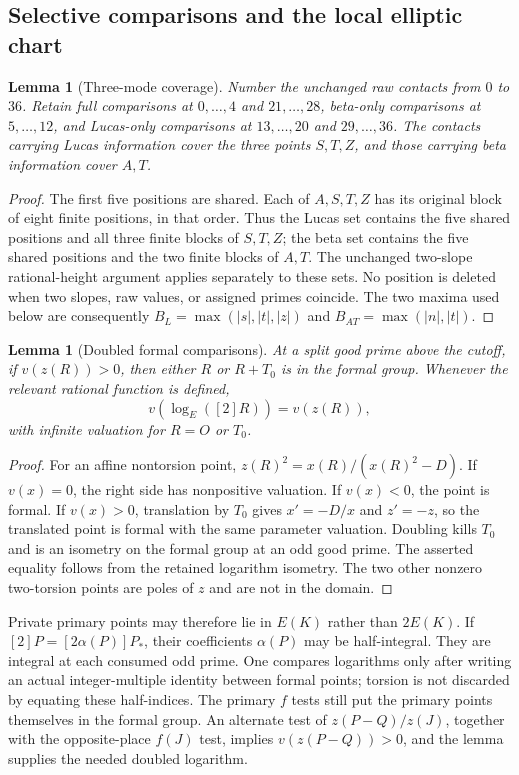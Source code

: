 \documentclass[11pt]{article}
\newtheorem{lemma}[theorem]{Lemma}
\theoremstyle{definition}
\theoremstyle{remark}
\providecommand{\LogE}{\log_E}
\begin{document}
\subsection{Selective comparisons and the local elliptic chart}

\begin{lemma}[Three-mode coverage]\label{lem:quartic-three-mode-coverage}
Number the unchanged raw contacts from $0$ to $36$. Retain full comparisons
at $0,\ldots,4$ and $21,\ldots,28$, beta-only comparisons at
$5,\ldots,12$, and Lucas-only comparisons at $13,\ldots,20$ and
$29,\ldots,36$. The contacts carrying Lucas information cover the three
points $S,T,Z$, and those carrying beta information cover $A,T$.
\end{lemma}
\begin{proof}
The first five positions are shared. Each of $A,S,T,Z$ has its original
block of eight finite positions, in that order. Thus the Lucas set contains
the five shared positions and all three finite blocks of $S,T,Z$; the beta
set contains the five shared positions and the two finite blocks of $A,T$.
The unchanged two-slope rational-height argument applies separately to
these sets. No position is deleted when two slopes, raw values, or assigned
primes coincide. The two maxima used below are consequently
$B_L=\max(|s|,|t|,|z|)$ and $B_{AT}=\max(|n|,|t|)$.
\end{proof}

\begin{lemma}[Doubled formal comparisons]
\label{lem:quartic-doubled-private-comparison}
At a split good prime above the cutoff, if $v(z(R))>0$, then either $R$ or
$R+T_0$ is in the formal group. Whenever the relevant rational function is
defined,
\[
 v(\LogE([2]R))=v(z(R)),
\]
with infinite valuation for $R=O$ or $T_0$.
\end{lemma}
\begin{proof}
For an affine nontorsion point,
$z(R)^2=x(R)/(x(R)^2-D)$. If $v(x)=0$, the right side has nonpositive
valuation. If $v(x)<0$, the point is formal. If $v(x)>0$, translation by
$T_0$ gives $x'=-D/x$ and $z'=-z$, so the translated point is formal with
the same parameter valuation. Doubling kills $T_0$ and is an isometry on
the formal group at an odd good prime. The asserted equality follows from
the retained logarithm isometry. The two other nonzero two-torsion points
are poles of $z$ and are not in the domain.
\end{proof}

Private primary points may therefore lie in $E(K)$ rather than $2E(K)$.
If $[2]P=[2\alpha(P)]P_*$, their coefficients $\alpha(P)$ may be
half-integral. They are integral at each consumed odd prime. One compares
logarithms only after writing an actual integer-multiple identity between
formal points; torsion is not discarded by equating these half-indices.
The primary $f$ tests still put the primary points themselves in the
formal group. An alternate test of
$z(P-Q)/z(J)$, together with the opposite-place $f(J)$ test, implies
$v(z(P-Q))>0$, and the lemma supplies the needed doubled logarithm.
\end{document}
